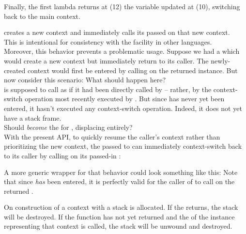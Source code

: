 Finally, the first lambda returns at (12) the  variable updated at
(10), switching back to the main context.



\callcc creates a new context and immediately calls its passed \entryfn on
that new context.\\

This is intentional for consistency with the \cc facility in other
languages.\cite{schemecallcc}\citecomma\cite{rubycallcc}\\

Moreover, this behavior prevents a problematic usage. Suppose we had a
 which would create a new context but immediately
return to its caller. The newly-created context would first be entered by
calling \resume on the returned \cont instance.
But now consider this scenario:
What should happen here?\\

\resumewith is supposed to call  as if it had been
directly called by  -- rather, by the context-switch
operation most recently executed by . But
since  has never yet been entered, it hasn't executed
any context-switch operation. Indeed, it does not yet have a stack frame.\\

Should  \emph{become} the \entryfn
for , displacing  entirely?\\

With the present API, to quickly resume the caller's context rather than
prioritizing the new context, the \entryfn passed to \callcc can immediately
context-switch back to its caller by calling \resume on its passed-in \cont:

A more generic wrapper for that behavior could look something like this:
Note that since  \emph{has} been entered, it
is perfectly valid for the caller of  to
call \resumewith on the returned \cont.


\label{subsec:destruction}

On construction of a context with \callcc a stack is allocated. If the
\entryfn returns, the stack will be destroyed. If the function has not yet
returned and the  of the \cont instance
representing that context is called, the stack will be unwound and destroyed.\\

